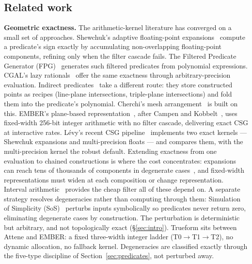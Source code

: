 \documentclass{egpubl}
\begin{document}
\subsection{Related work}
\label{sec:related}

\textbf{Geometric exactness.} The arithmetic-kernel literature has converged on a small set of approaches. Shewchuk's adaptive floating-point expansions~\cite{Shewchuk1997} compute a predicate's sign exactly by accumulating non-overlapping floating-point components, refining only when the filter cascade fails. The Filtered Predicate Generator (FPG)~\cite{MeyerPion2008} generates such filtered predicates from polynomial expressions. CGAL's lazy rationals~\cite{CGAL2023} offer the same exactness through arbitrary-precision evaluation. Indirect predicates~\cite{Attene2020} take a different route: they store constructed points as recipes (line-plane intersections, triple-plane intersections) and fold them into the predicate's polynomial. Cherchi's mesh arrangement~\cite{Cherchi2020} is built on this. EMBER's plane-based representation~\cite{Trettner2022,NehringWirxel2021}, after Campen and Kobbelt~\cite{Campen2010Intersections,Campen2010Boundary}, uses fixed-width 256-bit integer arithmetic with no filter cascade, delivering exact CSG at interactive rates. L\'evy's recent CSG pipeline~\cite{Levy2025} implements two exact kernels --- Shewchuk expansions and multi-precision floats --- and compares them, with the multi-precision kernel the robust default. Extending exactness from one evaluation to chained constructions is where the cost concentrates: expansions can reach tens of thousands of components in degenerate cases~\cite{Levy2025}, and fixed-width representations must widen at each composition or change representation. Interval arithmetic~\cite{Bronnimann1998} provides the cheap filter all of these depend on. A separate strategy resolves degeneracies rather than computing through them: Simulation of Simplicity (SoS)~\cite{EdelsbrunnerMucke1990} perturbs inputs symbolically so predicates never return zero, eliminating degenerate cases by construction. The perturbation is deterministic but arbitrary, and not topologically exact (\S\ref{sec:intro}). Trueform sits between Attene and EMBER: a fixed three-width integer ladder (T0$\to$T1$\to$T2), no dynamic allocation, no fallback kernel. Degeneracies are classified exactly through the five-type discipline of Section~\ref{sec:predicates}, not perturbed away.
\end{document}
